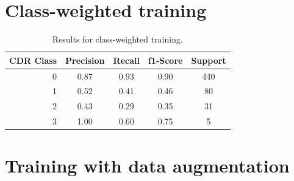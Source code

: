 \documentclass{kththesis}
\begin{document}
\section{Class-weighted training}
\begin{table}[h]
  \begin{center}
    \caption{Results for class-weighted training. \label{tab:results_class_weighted}}
    \begin{tabular}{r|ccc|c}
      \textbf{CDR Class} & \textbf{Precision} & \textbf{Recall} & \textbf{f1-Score} & \textbf{Support} \\
      \toprule
      0 & 0.87 & 0.93 & 0.90 & 440 \\
      1 & 0.52 & 0.41 & 0.46 & 80  \\
      2 & 0.43 & 0.29 & 0.35 & 31  \\
      3 & 1.00 & 0.60 & 0.75 & 5   \\
    \end{tabular}
  \end{center}
\end{table}

\section{Training with data augmentation}
\end{document}
